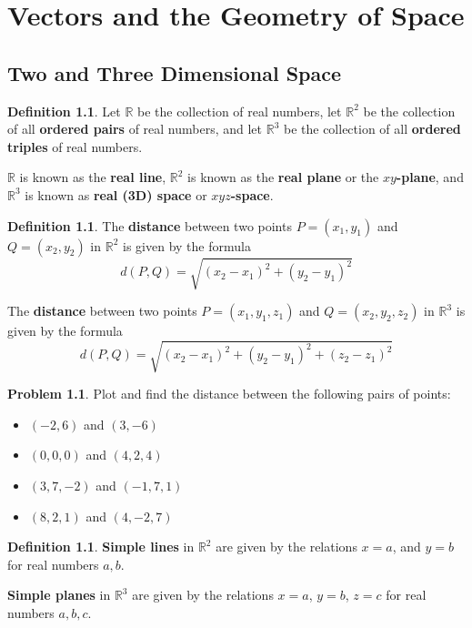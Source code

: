 \documentclass[letterpaper, twoside, 12pt]{book}
\newcommand{\<}{\langle}
\renewcommand{\>}{\rangle}
\theoremstyle{definition}
\theoremstyle{definition}
\newtheorem{definition}[theorem]{Definition}
\newtheorem{problem}[theorem]{Problem}
\begin{document}
\setcounter{chapter}{11}

\chapter{Vectors and the Geometry of Space}

\section{Two and Three Dimensional Space}

\begin{definition}
  Let $\mathbb{R}$ be the collection of real numbers, let $\mathbb{R}^2$ be the
  collection of all \textbf{ordered pairs} of real numbers, and let $\mathbb{R}^3$
  be the collection of all \textbf{ordered triples} of real numbers.

  $\mathbb{R}$ is known as the \textbf{real line}, $\mathbb{R}^2$ is known
  as the \textbf{real plane} or the \textbf{$xy$-plane}, and $\mathbb{R}^3$
  is known as \textbf{real (3D) space} or \textbf{$xyz$-space}.
\end{definition}

\begin{definition}
  The \textbf{distance} between two points $P=(x_1,y_1)$ and
  $Q=(x_2,y_2)$ in $\mathbb{R}^2$ is given by the formula
  \[
    d(P,Q) = \sqrt{(x_2-x_1)^2+(y_2-y_1)^2}
  \]

  The \textbf{distance} between two points $P=(x_1,y_1,z_1)$ and
  $Q=(x_2,y_2,z_2)$ in $\mathbb{R}^3$ is given by the formula
  \[
    d(P,Q) = \sqrt{(x_2-x_1)^2+(y_2-y_1)^2+(z_2-z_1)^2}
  \]
\end{definition}

\begin{problem}
  Plot and find the distance between the following pairs of points:
  \begin{itemize}
    \item $(-2,6)$ and $(3,-6)$
    \item $(0,0,0)$ and $(4,2,4)$
    \item $(3,7,-2)$ and $(-1,7,1)$
    \item $(8,2,1)$ and $(4,-2,7)$
  \end{itemize}
\end{problem}

\vfill

\newpage

\begin{definition}
  \textbf{Simple lines} in $\mathbb{R}^2$ are given by the relations $x=a$,
  and $y=b$ for real numbers $a,b$.

  \textbf{Simple planes} in $\mathbb{R}^3$ are given by the relations $x=a$,
  $y=b$, $z=c$ for real numbers $a,b,c$.
\end{definition}
\end{document}
